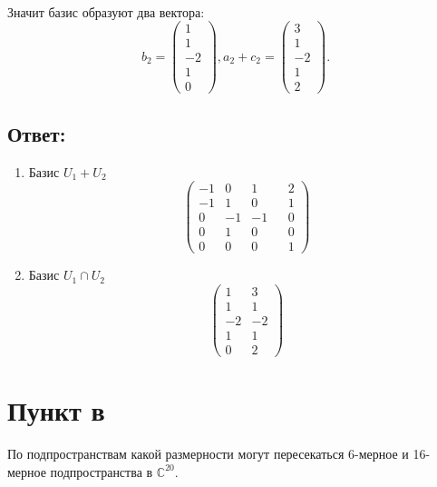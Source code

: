 \documentclass[12pt]{article}
\begin{document}
\begin{enumerate}
\begin{gather*}
        \end{gather*}
        Значит базис образуют два вектора:
        \[
            b_2 =
            \begin{pmatrix}
                1 \\ 1 \\ -2 \\ 1 \\ 0
            \end{pmatrix} ,
            a_2 + c_2 =
            \begin{pmatrix}
                3 \\ 1 \\ -2 \\ 1 \\ 2
            \end{pmatrix} .
        \]
    \end{enumerate}

    \subsection*{Ответ:}
    \begin{enumerate}
        \item
        Базис $U_1 + U_2$
        \[
            \begin{pmatrix}
                -1 & 0  & 1  & & 2 \\
                -1 & 1  & 0  & & 1 \\
                0  & -1 & -1 & & 0 \\
                0  & 1  & 0  & & 0 \\
                0  & 0  & 0  & & 1
            \end{pmatrix}
        \]
        \item
        Базис $U_1 \cap U_2$
        \[
            \begin{pmatrix}
                1  & 3  \\
                1  & 1  \\
                -2 & -2 \\
                1  & 1  \\
                0  & 2
            \end{pmatrix}
        \]
    \end{enumerate}

    \section*{Пункт в}
    По подпространствам какой размерности могут пересекаться 6-мерное и 16-мерное подпространства в $\mathbb{C}^{20}$.
\end{document}
